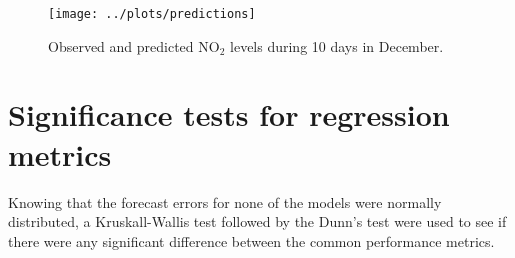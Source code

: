 
\begin{figure}[h] 
\begin{center}
\texttt{[image: ../plots/predictions]}
\caption{Observed and predicted NO$_2$ levels during 10 days in December.}
\label{fig:pred_vs_obs}
\end{center}
\end{figure}

\section{Significance tests for regression metrics}

Knowing that the forecast errors for none of the models were normally distributed, a Kruskall-Wallis test followed by the Dunn's test were used to see if there were any significant difference between the common performance metrics. 

%
%
%






